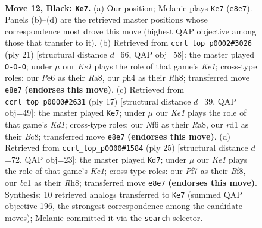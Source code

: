 \documentclass[11pt]{article}
\begin{document}
\clearpage

\begin{figure}[p]\centering
\begin{subfigure}{0.46\textwidth}\centering
\resizebox{\linewidth}{!}{%
\newchessgame
\chessboard[
  setfen={r1b1kb1r/1p3ppp/2n1pn2/pBP3N1/7P/4P3/PP3P2/RNBR2K1 b kq - 2 12},
  showmover=false,
  pgfstyle=straightmove, color=movearrow, markmove={e8-e7}
]}
\caption{}
\end{subfigure}\hfill
\begin{subfigure}{0.46\textwidth}\centering
\resizebox{\linewidth}{!}{%
\newchessgame
\chessboard[
  setfen={r3kb1r/pp2pppp/2n2n2/1B2N3/6b1/8/PPP2PPP/R1BNK2R b KQkq - 1 11},
  showmover=false,
  pgfstyle=straightmove, color=movearrow, markmove={e8-c8}
]}
\caption{}
\end{subfigure}
\\[4pt]
\begin{subfigure}{0.46\textwidth}\centering
\resizebox{\linewidth}{!}{%
\newchessgame
\chessboard[
  setfen={r1bk3r/ppp2ppp/3b1n2/1N2n1B1/4P3/8/PPP3PP/R3KBNR b KQ - 3 9},
  showmover=false,
  pgfstyle=straightmove, color=movearrow, markmove={d8-e7}
]}
\caption{}
\end{subfigure}\hfill
\begin{subfigure}{0.46\textwidth}\centering
\resizebox{\linewidth}{!}{%
\newchessgame
\chessboard[
  setfen={r1b1kb1r/pp2pnpp/5n2/1NpP1pB1/5N1P/5P2/P1P5/R3KB1R b KQkq - 0 13},
  showmover=false,
  pgfstyle=straightmove, color=movearrow, markmove={e8-d7}
]}
\caption{}
\end{subfigure}
\caption{\textbf{Move 12, Black: \texttt{Ke7}.} (a) Our position; Melanie plays \texttt{Ke7} (\texttt{e8e7}). Panels (b)--(d) are the retrieved master positions whose correspondence most drove this move (highest QAP objective among those that transfer to it). (b) Retrieved from \texttt{ccrl\_top\_p0002\#3026} (ply 21) [structural distance $d$=66, QAP obj=58]: the master played \texttt{O-O-O}; under $\mu$ our \emph{Ke1} plays the role of that game's \emph{Ke1}; cross-type roles: our \emph{P}e6 as their \emph{R}a8, our \emph{p}h4 as their \emph{R}h8; transferred move \texttt{e8e7} \textbf{(endorses this move)}. (c) Retrieved from \texttt{ccrl\_top\_p0000\#2631} (ply 17) [structural distance $d$=39, QAP obj=49]: the master played \texttt{Ke7}; under $\mu$ our \emph{Ke1} plays the role of that game's \emph{Kd1}; cross-type roles: our \emph{N}f6 as their \emph{R}a8, our \emph{r}d1 as their \emph{B}c8; transferred move \texttt{e8e7} \textbf{(endorses this move)}. (d) Retrieved from \texttt{ccrl\_top\_p0000\#1584} (ply 25) [structural distance $d$=72, QAP obj=23]: the master played \texttt{Kd7}; under $\mu$ our \emph{Ke1} plays the role of that game's \emph{Ke1}; cross-type roles: our \emph{P}f7 as their \emph{B}f8, our \emph{b}c1 as their \emph{R}h8; transferred move \texttt{e8e7} \textbf{(endorses this move)}. Synthesis: 10 retrieved analogs transferred to \texttt{Ke7} (summed QAP objective 196, the strongest correspondence among the candidate moves); Melanie committed it via the \texttt{search} selector.}
\label{fig:thought-m23}
\end{figure}
\end{document}
